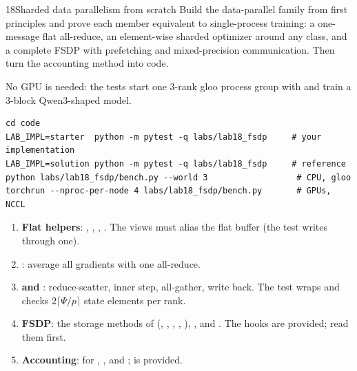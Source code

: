 \begin{labbox}{18}{Sharded data parallelism from scratch}
Build the data-parallel family from first principles and prove each member equivalent to
single-process training: a one-message flat all-reduce, an element-wise sharded optimizer
around any  class, and a complete FSDP with prefetching and mixed-precision
communication. Then turn the accounting method into code.

No GPU is needed: the tests start one 3-rank gloo process group with
 and train a 3-block Qwen3-shaped model.
\begin{lstlisting}[style=shell]
cd code
LAB_IMPL=starter  python -m pytest -q labs/lab18_fsdp     # your implementation
LAB_IMPL=solution python -m pytest -q labs/lab18_fsdp     # reference
python labs/lab18_fsdp/bench.py --world 3                  # CPU, gloo
torchrun --nproc-per-node 4 labs/lab18_fsdp/bench.py       # GPUs, NCCL
\end{lstlisting}

\begin{enumerate}
  \item \textbf{Flat helpers}: , ,
    , . The views must alias the flat buffer (the test
    writes through one).
  \item \textbf{}: average all gradients with one all-reduce.
  \item \textbf{ and }: reduce-scatter, inner
    step, all-gather, write back. The test wraps  and checks
    $2\lceil\Psi/p\rceil$ state elements per rank.
  \item \textbf{FSDP}: the storage methods of  (,
    , , , ),
    ,  and
    . The hooks are provided; read them first.
  \item \textbf{Accounting}:  for , ,
     and ;  is provided.
\end{enumerate}


\end{labbox}
